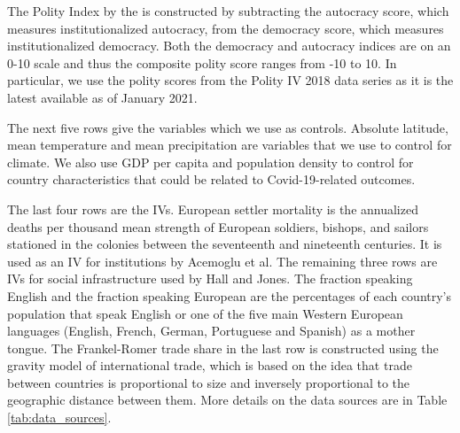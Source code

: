 The Polity Index by the \citet{polity} is constructed by subtracting the autocracy score, which measures institutionalized autocracy, from the democracy score, which measures institutionalized democracy. Both the democracy and autocracy indices are on an 0-10 scale and thus the composite polity score ranges from -10 to 10. In particular, we use the polity scores from the Polity IV 2018 data series as it is the latest available as of January 2021. 

The next five rows give the variables which we use as controls. Absolute latitude, mean temperature and mean precipitation are variables that we use to control for climate. We also use GDP per capita and population density to control for country characteristics that could be related to Covid-19-related outcomes. 

The last four rows are the IVs. European settler mortality is the annualized deaths per thousand mean strength of European soldiers, bishops, and sailors stationed in the colonies between the seventeenth and nineteenth centuries. It is used as an IV for institutions by Acemoglu et al. The remaining three rows are IVs for social infrastructure used by Hall and Jones. The fraction speaking English and the fraction speaking European are the percentages of each country's population that speak English or one of the five main Western European languages (English, French, German, Portuguese and Spanish) as a mother tongue. The Frankel-Romer trade share in the last row is constructed using the gravity model of international trade, which is based on the idea that trade between countries is proportional to size and inversely proportional to the geographic distance between them. 
More details on the data sources are in Table \ref{tab:data_sources}. 
    